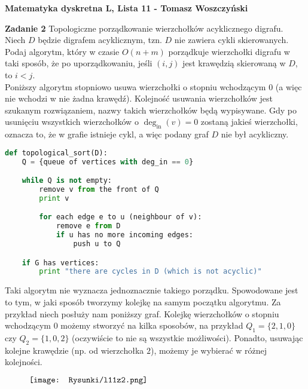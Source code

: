 \documentclass[a4paper,12pt]{article}
\begin{document}
\noindent \textbf{Matematyka dyskretna L, Lista 11 - Tomasz Woszczyński}\newline

\noindent \newline \textbf{Zadanie 2} \newline
Topologiczne porządkowanie wierzchołków acyklicznego digrafu. Niech $D$ będzie digrafem
acyklicznym, tzn. $D$ nie zawiera cykli skierowanych. Podaj algorytm, który w czasie
$O(n + m)$ porządkuje wierzchołki digrafu w taki sposób, że po uporządkowaniu, jeśli
$(i, j)$ jest krawędzią skierowaną w $D$, to $i < j$. \\

\noindent Poniższy algorytm stopniowo usuwa wierzchołki o stopniu wchodzącym $0$ (a więc nie 
wchodzi w nie żadna krawędź). Kolejność usuwania wierzchołków jest szukanym rozwiązaniem, 
nazwy  takich wierzchołków będą wypisywane. Gdy po usunięciu wszystkich wierzchołków o 
$\deg_{\text{in}}(v) = 0$ zostaną jakieś wierzchołki, oznacza to, że w grafie istnieje cykl, 
a więc podany graf $D$ nie był acykliczny.

\begin{lstlisting}[style=code, language=python]
def topological_sort(D):
    Q = {queue of vertices with deg_in == 0}

    while Q is not empty:
        remove v from the front of Q
        print v

        for each edge e to u (neighbour of v):
            remove e from D
            if u has no more incoming edges:
                push u to Q

    if G has vertices:
        print "there are cycles in D (which is not acyclic)"
\end{lstlisting}

\noindent Taki algorytm nie wyznacza jednoznacznie takiego porządku. Spowodowane jest to
tym, w jaki sposób tworzymy kolejkę na samym początku algorytmu. Za przykład niech posłuży
nam poniższy graf. Kolejkę wierzchołków o stopniu wchodzącym $0$ możemy stworzyć na kilka
sposobów, na przykład $Q_1 = \{ 2, 1, 0\}$ czy $Q_2 = \{ 1, 0, 2 \}$ (oczywiście to nie są
wszystkie możliwości). Ponadto, usuwając kolejne krawędzie (np. od wierzchołka $2$), możemy
je wybierać w różnej kolejności. 

\begin{figure}[H]
    \centering
    $\vcenter{\hbox{\texttt{[image: Rysunki/l11z2.png]}}}$
\end{figure}
\end{document}
